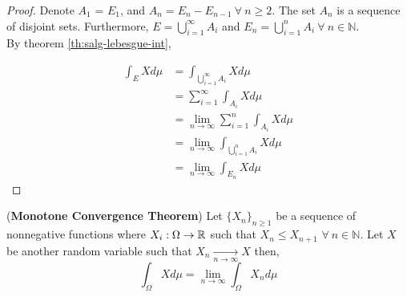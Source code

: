 \documentclass[../TGMAFFIRO.tex]{subfiles}
\begin{document}
\begin{proof}
	Denote $A_1$ = $E_1$, and $A_n = E_n - E_{n-1} \ \forall \ n \geq 2$. The set $A_n$ is a sequence of disjoint sets. Furthermore, $E = \bigcup_{i=1}^\infty A_i$ and $E_n = \bigcup_{i=1}^n A_i \ \forall \ n \in \mathbb{N}$.\\
	
	By theorem \ref{th:salg-lebesgue-int},
	
	\begin{align*}
		\int_E X d\mu &= \int_{\bigcup_{i=1}^{\infty} A_i} X d\mu \\
		&= \sum_{i=1}^{\infty} \int_{A_i} X d\mu \\
		&= \lim_{n\to\infty} \sum_{i=1}^{n} \int_{A_i} X d\mu \\ 
		&= \lim_{n\to\infty} \int_{\bigcup_{i=1}^{n} A_i} X d\mu \\
		&= \lim_{n\to\infty} \int_{E_n} X d\mu
	\end{align*}
\end{proof}


\begin{theorem} (\textbf{Monotone Convergence Theorem})
Let $\{X_n\}_{n\geq 1}$ be a sequence of nonnegative functions where $X_i: \Omega \to \mathbb{R}$ such that $X_n \leq X_{n+1}$ $\forall \ n \in \mathbb{N}$. Let $X$ be another random variable such that $X_n \xrightarrow[n \to \infty]{}X$ then,
\begin{equation}
	\int_\Omega X d\mu = \lim_{n\to \infty} \int_\Omega X_n d\mu
\end{equation}
\end{theorem}
\end{document}

